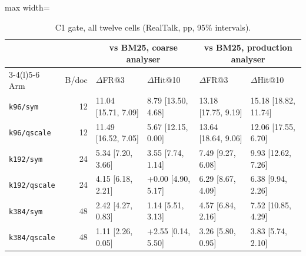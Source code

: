 \begin{table}[H]
\centering
\footnotesize
\caption{C1 gate, all twelve cells (RealTalk, pp, 95\% intervals).}
\label{tab:c1}
\begin{adjustbox}{max width=\linewidth}\begin{tabular}{@{}l r l l l l@{}}
\toprule
& & \multicolumn{2}{c}{vs BM25, coarse analyser} & \multicolumn{2}{c}{vs BM25, production analyser} \\
\cmidrule(lr){3-4}\cmidrule(l){5-6}
Arm & B/doc & $\Delta$FR@3 & $\Delta$Hit@10 & $\Delta$FR@3 & $\Delta$Hit@10 \\
\midrule
\texttt{k96/sym} & 12 & \textminus{}11.04 [\textminus{}15.71, \textminus{}7.09] & \textminus{}8.79 [\textminus{}13.50, \textminus{}4.68] & \textminus{}13.18 [\textminus{}17.75, \textminus{}9.19] & \textminus{}15.18 [\textminus{}18.82, \textminus{}11.74] \\
\texttt{k96/qscale} & 12 & \textminus{}11.49 [\textminus{}16.52, \textminus{}7.05] & \textminus{}5.67 [\textminus{}12.15, 0.00] & \textminus{}13.64 [\textminus{}18.64, \textminus{}9.06] & \textminus{}12.06 [\textminus{}17.55, \textminus{}6.70] \\
\texttt{k192/sym} & 24 & \textminus{}5.34 [\textminus{}7.20, \textminus{}3.66] & \textminus{}3.55 [\textminus{}7.74, 1.14] & \textminus{}7.49 [\textminus{}9.27, \textminus{}6.08] & \textminus{}9.93 [\textminus{}12.62, \textminus{}7.26] \\
\texttt{k192/qscale} & 24 & \textminus{}4.15 [\textminus{}6.18, \textminus{}2.21] & +0.00 [\textminus{}4.90, 5.17] & \textminus{}6.29 [\textminus{}8.67, \textminus{}4.09] & \textminus{}6.38 [\textminus{}9.94, \textminus{}2.26] \\
\texttt{k384/sym} & 48 & \textminus{}2.42 [\textminus{}4.27, \textminus{}0.83] & \textminus{}1.14 [\textminus{}5.51, 3.13] & \textminus{}4.57 [\textminus{}6.84, \textminus{}2.16] & \textminus{}7.52 [\textminus{}10.85, \textminus{}4.29] \\
\texttt{k384/qscale} & 48 & \textminus{}1.11 [\textminus{}2.26, 0.05] & +2.55 [\textminus{}0.14, 5.50] & \textminus{}3.26 [\textminus{}5.80, \textminus{}0.95] & \textminus{}3.83 [\textminus{}5.74, \textminus{}2.10] \\
\bottomrule
\end{tabular}\end{adjustbox}
\end{table}
